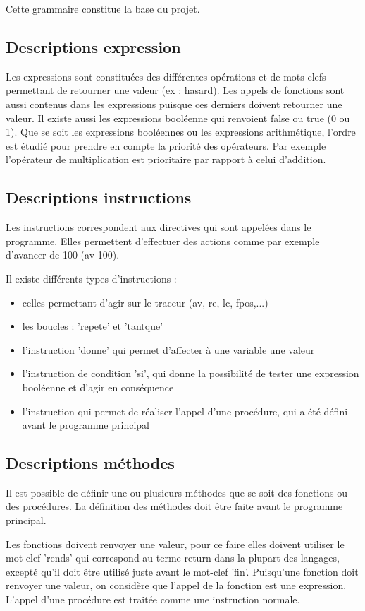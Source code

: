 \documentclass[a4paper,11pt]{article}
\begin{document}
Cette grammaire constitue la base du projet.

\subsection{Descriptions expression}
Les expressions sont constituées des différentes opérations et de mots clefs permettant de retourner une valeur (ex : hasard). Les appels de fonctions sont aussi contenus dans les expressions puisque ces derniers doivent retourner une valeur.
Il existe aussi les expressions booléenne qui renvoient false ou true (0 ou 1).
Que se soit les expressions booléennes ou les expressions arithmétique, l'ordre est étudié pour prendre en compte la priorité des opérateurs. Par exemple l'opérateur de multiplication est prioritaire par rapport à celui d'addition.

\subsection{Descriptions instructions}
Les instructions correspondent aux directives qui sont appelées dans le programme. Elles permettent d'effectuer des actions comme par exemple d'avancer de 100 (av 100).

Il existe différents types d'instructions :
\begin{itemize}
	\item celles permettant d'agir sur le traceur (av, re, lc, fpos,...)
	\item les boucles : 'repete' et 'tantque'
	\item l'instruction 'donne' qui permet d'affecter à une variable une valeur
	\item l'instruction de condition 'si', qui donne la possibilité de tester une expression booléenne et d'agir en conséquence
	\item l'instruction qui permet de réaliser l'appel d'une procédure, qui a été défini avant le programme principal
\end{itemize}

\subsection{Descriptions méthodes}
Il est possible de définir une ou plusieurs méthodes que se soit des fonctions ou des procédures. La définition des méthodes doit être faite avant le programme principal.

Les fonctions doivent renvoyer une valeur, pour ce faire elles doivent utiliser le mot-clef 'rends' qui correspond au terme return dans la plupart des langages, excepté qu'il doit être utilisé juste avant le mot-clef 'fin'.
Puisqu'une fonction doit renvoyer une valeur, on considère que l'appel de la fonction est une expression.
L'appel d'une procédure est traitée comme une instruction normale.
\end{document}

